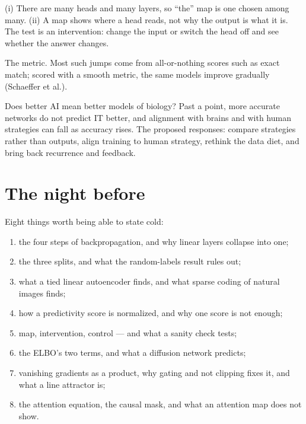 \documentclass[11pt]{article}
\begin{document}
 (i) There are many heads and many layers, so ``the'' map is one chosen
among many. (ii) A map shows where a head reads, not why the output is what it
is. The test is an intervention: change the input or switch the head off and see
whether the answer changes.

 The metric. Most such jumps come from all-or-nothing scores such as
exact match; scored with a smooth metric, the same models improve gradually
(Schaeffer et al.).

 Does better AI mean better models of biology? Past a point, more
accurate networks do not predict IT better, and alignment with brains and with
human strategies can fall as accuracy rises. The proposed responses: compare
strategies rather than outputs, align training to human strategy, rethink the
data diet, and bring back recurrence and feedback.

\section*{The night before}

Eight things worth being able to state cold:

\begin{enumerate}
  \item the four steps of backpropagation, and why linear layers collapse into
        one;
  \item the three splits, and what the random-labels result rules out;
  \item what a tied linear autoencoder finds, and what sparse coding of natural
        images finds;
  \item how a predictivity score is normalized, and why one score is not enough;
  \item map, intervention, control --- and what a sanity check tests;
  \item the ELBO's two terms, and what a diffusion network predicts;
  \item vanishing gradients as a product, why gating and not clipping fixes it,
        and what a line attractor is;
  \item the attention equation, the causal mask, and what an attention map does
        not show.
\end{enumerate}
\end{document}
